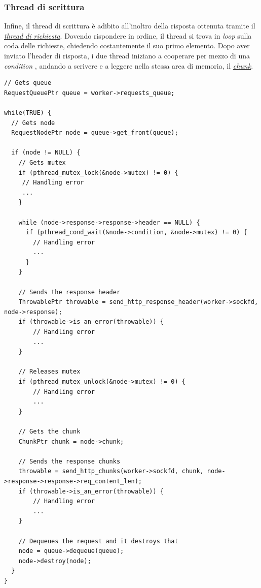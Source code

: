 \documentclass[italian]{tktltiki2}
\begin{document}
\subsubsection{Thread di scrittura}
\label{sec:writer}
Infine, il thread di scrittura è adibito all'inoltro della risposta ottenuta tramite il \hyperref[sec:request]{\emph{thread di richiesta}}. Dovendo rispondere in ordine, il thread si trova in \emph{loop} sulla coda delle richieste, chiedendo costantemente il suo primo elemento. Dopo aver inviato l'header di risposta, i due thread iniziano a cooperare per mezzo di una \emph{condition} , andando a scrivere e a leggere nella stessa area di memoria, il \hyperref[sec:chunk]{\emph{chunk}}.
\begin{lstlisting}
// Gets queue
RequestQueuePtr queue = worker->requests_queue;

while(TRUE) {
  // Gets node
  RequestNodePtr node = queue->get_front(queue);

  if (node != NULL) {
    // Gets mutex
    if (pthread_mutex_lock(&node->mutex) != 0) {
     // Handling error
     ...
    }

    while (node->response->response->header == NULL) {
      if (pthread_cond_wait(&node->condition, &node->mutex) != 0) {
        // Handling error
        ...
      }
    }

    // Sends the response header
    ThrowablePtr throwable = send_http_response_header(worker->sockfd, node->response);
    if (throwable->is_an_error(throwable)) {
        // Handling error
        ...
    }

    // Releases mutex
    if (pthread_mutex_unlock(&node->mutex) != 0) {
        // Handling error
        ...
    }

    // Gets the chunk
    ChunkPtr chunk = node->chunk;

    // Sends the response chunks
    throwable = send_http_chunks(worker->sockfd, chunk, node->response->response->req_content_len);
    if (throwable->is_an_error(throwable)) {
        // Handling error
        ...
    }

    // Dequeues the request and it destroys that
    node = queue->dequeue(queue);
    node->destroy(node);
  }
}
\end{lstlisting}
\end{document}

